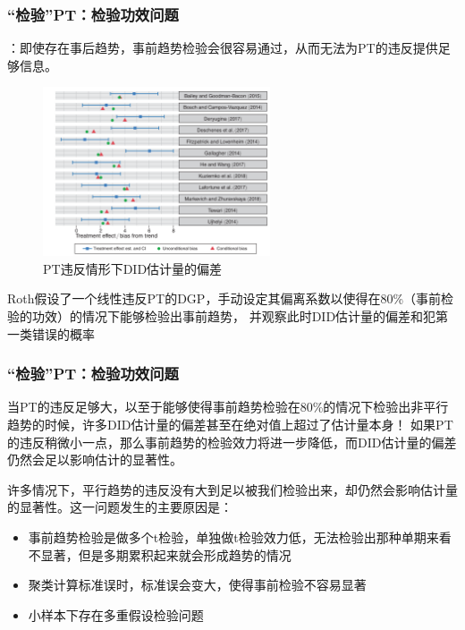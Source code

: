 \documentclass[../didNotes.tex]{subfiles}
\begin{document}
\begin{frame}
  \frametitle{``检验''PT：检验功效问题}

  \textcite{roth2022}：即使存在事后趋势，事前趋势检验会很容易通过，从而无法为PT的违反提供足够信息。

  \begin{figure}[htbp]
    \begin{center}
      \includegraphics[width=0.6\textwidth]{./assets/PT_caution.png}
    \end{center}
    \caption{PT违反情形下DID估计量的偏差}
    \label{pic:PT_bias}
  \end{figure}

  Roth假设了一个线性违反PT的DGP，手动设定其偏离系数以使得在80\%（事前检验的功效）的情况下能够检验出事前趋势，
  并观察此时DID估计量的偏差和犯第一类错误的概率
\end{frame}

\begin{frame}
  \frametitle{``检验''PT：检验功效问题}

  当PT的违反足够大，以至于能够使得事前趋势检验在80\%的情况下检验出非平行趋势的时候，许多DID估计量的偏差甚至在绝对值上超过了估计量本身！
  如果PT的违反稍微小一点，那么事前趋势的检验效力将进一步降低，而DID估计量的偏差仍然会足以影响估计的显著性。

  \vspace{1em}
  许多情况下，平行趋势的违反没有大到足以被我们检验出来，却仍然会影响估计量的显著性。这一问题发生的主要原因是：
  \begin{itemize}
    \item 事前趋势检验是做多个t检验，单独做t检验效力低，无法检验出那种单期来看不显著，但是多期累积起来就会形成趋势的情况
    \item 聚类计算标准误时，标准误会变大，使得事前检验不容易显著
    \item 小样本下存在多重假设检验问题
  \end{itemize}

\end{frame}
\end{document}
